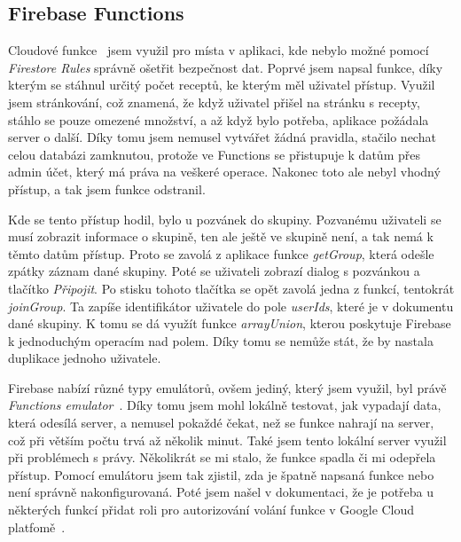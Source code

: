 \subsection{Firebase Functions}
Cloudové funkce~\cite{FirebaseFunctions} jsem využil pro místa v aplikaci, kde nebylo možné pomocí \emph{Firestore Rules} správně ošetřit bezpečnost dat.
Poprvé jsem napsal funkce, díky kterým se stáhnul určitý počet receptů, ke kterým měl uživatel přístup. Využil jsem stránkování,
což znamená, že když uživatel přišel na stránku s recepty, stáhlo se pouze omezené množství, a až když bylo potřeba, aplikace požádala
server o další. Díky tomu jsem nemusel vytvářet žádná pravidla, stačilo nechat celou databázi zamknutou, protože ve Functions se přistupuje
k datům přes admin účet, který má práva na veškeré operace. Nakonec toto ale nebyl vhodný přístup, a tak jsem funkce odstranil.

Kde se tento přístup hodil, bylo u pozvánek do skupiny. Pozvanému uživateli se musí zobrazit informace o skupině, ten ale ještě ve skupině není,
a tak nemá k těmto datům přístup. Proto se zavolá z aplikace funkce \emph{getGroup}, která odešle zpátky záznam dané skupiny. Poté se uživateli
zobrazí dialog s pozvánkou a tlačítko \emph{Připojit}. Po stisku tohoto tlačítka se opět zavolá jedna z funkcí, tentokrát \emph{joinGroup}. Ta
zapíše identifikátor uživatele do pole \emph{userIds}, které je v dokumentu dané skupiny. K tomu se dá využít funkce \emph{arrayUnion}, kterou poskytuje
Firebase k jednoduchým operacím nad polem. Díky tomu se nemůže stát, že by nastala duplikace jednoho uživatele.

Firebase nabízí různé typy emulátorů, ovšem jediný, který jsem využil, byl právě \emph{Functions emulator}~\cite{FirebaseEmulator}. Díky tomu jsem mohl lokálně testovat, jak vypadají
data, která odesílá server, a nemusel pokaždé čekat, než se funkce nahrají na server, což při větším počtu trvá až několik minut. Také jsem tento lokální server
využil při problémech s právy. Několikrát se mi stalo, že funkce spadla či mi odepřela přístup. Pomocí emulátoru jsem tak zjistil, zda je špatně napsaná funkce
nebo není správně nakonfigurovaná. Poté jsem našel v dokumentaci, že je potřeba u některých funkcí přidat roli pro autorizování volání funkce v Google
Cloud platfomě~\cite{CloudRights}.
